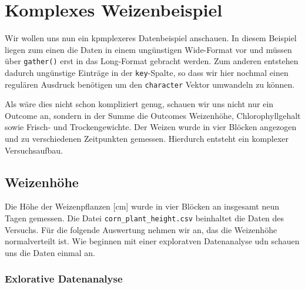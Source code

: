 \documentclass[
  letterpaper,
]{scrbook}
\begin{document}
\hypertarget{komplexes-weizenbeispiel}{%
\section{Komplexes Weizenbeispiel}\label{komplexes-weizenbeispiel}}

Wir wollen uns nun ein kpmplexeres Datenbeispiel anschauen. In diesem
Beispiel liegen zum einen die Daten in einem ungünstigen Wide-Format vor
und müssen über \texttt{gather()} erst in das Long-Format gebracht
werden. Zum anderen entstehen dadurch ungünstige Einträge in der
\texttt{key}-Spalte, so dass wir hier nochmal einen regulären Ausdruck
benötigen um den \texttt{character} Vektor umwandeln zu können.

Als wäre dies nicht schon kompliziert genug, schauen wir uns nicht nur
ein Outcome an, sondern in der Summe die Outcomes Weizenhöhe,
Chlorophyllgehalt sowie Frisch- und Trockengewichte. Der Weizen wurde in
vier Blöcken angezogen und zu verschiedenen Zeitpunkten gemessen.
Hierdurch entsteht ein komplexer Versuchsaufbau.

\hypertarget{weizenhuxf6he}{%
\subsection{Weizenhöhe}\label{weizenhuxf6he}}

Die Höhe der Weizenpflanzen {[}cm{]} wurde in vier Blöcken an insgesamt
neun Tagen gemessen. Die Datei \texttt{corn\_plant\_height.csv}
beinhaltet die Daten des Versuchs. Für die folgende Auswertung nehmen
wir an, das die Weizenhöhe normalverteilt ist. Wie beginnen mit einer
exploratven Datenanalyse udn schauen uns die Daten einmal an.

\hypertarget{exlorative-datenanalyse}{%
\subsubsection{Exlorative Datenanalyse}\label{exlorative-datenanalyse}}
\end{document}
